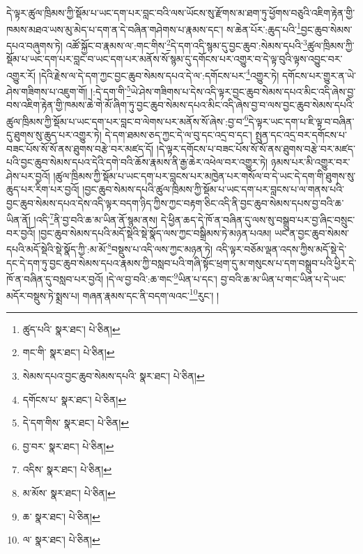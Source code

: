 དེ་ལྟར་ཚུལ་ཁྲིམས་ཀྱི་སྡོམ་པ་ཡང་དག་པར་བླང་བའི་ལས་ཡོངས་སུ་རྫོགས་མ་ཐག་ཏུ་ཕྱོགས་བཅུའི་འཇིག་རྟེན་གྱི་ཁམས་མཐའ་ཡས་མུ་མེད་པ་དག་ན་དེ་བཞིན་གཤེགས་པ་རྣམས་དང་། ས་ཆེན་པོར་:ཆུད་པའི་\footnote{ཚུད་པའི་  སྣར་ཐང་།  པེ་ཅིན། }བྱང་ཆུབ་སེམས་དཔའ་བཞུགས་ཏེ། འཚོ་སྐྱོང་བ་རྣམས་ལ་:གང་གིས་\footnote{གང་གི་  སྣར་ཐང་།  པེ་ཅིན། }དེ་དག་འདི་སྙམ་དུ་བྱང་ཆུབ་:སེམས་དཔའི་\footnote{སེམས་དཔའ་བྱང་ཆུབ་སེམས་དཔའི་  སྣར་ཐང་།  པེ་ཅིན། }ཚུལ་ཁྲིམས་ཀྱི་སྡོམ་པ་ཡང་དག་པར་བླང་བ་ཡང་དག་པར་མནོས་སོ་སྙམ་དུ་དགོངས་པར་འགྱུར་བ་དེ་ལྟ་བུའི་ལྟས་འབྱུང་བར་འགྱུར་རོ། །དེའི་རྗེས་ལ་དེ་དག་ཀྱང་བྱང་ཆུབ་སེམས་དཔའ་དེ་ལ་:དགོངས་པར་\footnote{དགོངས་པ་  སྣར་ཐང་།  པེ་ཅིན། }འགྱུར་ཏེ། དགོངས་པར་གྱུར་ན་ཡེ་ཤེས་གཟིགས་པ་འཇུག་གོ། །:དེ་དག་གི་\footnote{དེ་དག་གིས་  སྣར་ཐང་།  པེ་ཅིན། }ཡེ་ཤེས་གཟིགས་པ་དེས་འདི་ལྟར་བྱང་ཆུབ་སེམས་དཔའ་མིང་འདི་ཞེས་བྱ་བས་འཇིག་རྟེན་གྱི་ཁམས་ཆེ་གེ་མོ་ཞིག་ཏུ་བྱང་ཆུབ་སེམས་དཔའ་མིང་འདི་ཞེས་བྱ་བ་ལས་བྱང་ཆུབ་སེམས་དཔའི་ཚུལ་ཁྲིམས་ཀྱི་སྡོམ་པ་ཡང་དག་པར་བླང་བ་ལེགས་པར་མནོས་སོ་ཞེས་:བྱ་བ་\footnote{བྱ་བར་  སྣར་ཐང་།  པེ་ཅིན། }དེ་ལྟར་ཡང་དག་པ་ཇི་ལྟ་བ་བཞིན་དུ་ཐུགས་སུ་ཆུད་པར་འགྱུར་ཏེ། དེ་དག་ཐམས་ཅད་ཀྱང་དེ་ལ་བུ་དང་འདྲ་བ་དང་། སྤུན་དང་འདྲ་བར་དགོངས་པ་བཟང་པོས་སོ་སོ་ནས་ཐུགས་བརྩེ་བར་མཛད་དོ། །དེ་ལྟར་དགོངས་པ་བཟང་པོས་སོ་སོ་ནས་ཐུགས་བརྩེ་བར་མཛད་པའི་བྱང་ཆུབ་སེམས་དཔའ་དེའི་དགེ་བའི་ཆོས་རྣམས་ནི་རྒྱ་ཆེར་འཕེལ་བར་འགྱུར་ཏེ། ཉམས་པར་མི་འགྱུར་བར་ཤེས་པར་བྱའོ། །ཚུལ་ཁྲིམས་ཀྱི་སྡོམ་པ་ཡང་དག་པར་བླངས་པར་མཁྱེན་པར་གསོལ་བ་དེ་ཡང་དེ་དག་གི་ཐུགས་སུ་ཆུད་པར་རིག་པར་བྱའོ། །བྱང་ཆུབ་སེམས་དཔའི་ཚུལ་ཁྲིམས་ཀྱི་སྡོམ་པ་ཡང་དག་པར་བླངས་པ་ལ་གནས་པའི་བྱང་ཆུབ་སེམས་དཔའ་དེས་འདི་ལྟར་བདག་ཉིད་ཀྱིས་ཀྱང་བརྟག་ཅིང་འདི་ནི་བྱང་ཆུབ་སེམས་དཔས་བྱ་བའི་ཆ་ཡིན་ནོ། །འདི་\footnote{འདིས་  སྣར་ཐང་།  པེ་ཅིན། }ནི་བྱ་བའི་ཆ་མ་ཡིན་ནོ་སྙམ་ནས། དེ་ཕྱིན་ཆད་དེ་ཁོ་ན་བཞིན་དུ་ལས་སུ་བསྒྲུབ་པར་བྱ་ཞིང་བསྲུང་བར་བྱའོ། །བྱང་ཆུབ་སེམས་དཔའི་མདོ་སྡེའི་སྡེ་སྣོད་ལས་ཀྱང་བསྒྲིམས་ཏེ་མཉན་པའམ། ཡང་ན་བྱང་ཆུབ་སེམས་དཔའི་མདོ་སྡེའི་སྡེ་སྣོད་ཀྱི་:མ་མོ་\footnote{མ་མོས་  སྣར་ཐང་།  པེ་ཅིན། }བསྡུས་པ་འདི་ལས་ཀྱང་མཉན་ཏེ། འདི་ལྟར་བཅོམ་ལྡན་འདས་ཀྱིས་མདོ་སྡེ་དེ་དང་དེ་དག་ཏུ་བྱང་ཆུབ་སེམས་དཔའ་རྣམས་ཀྱི་བསླབ་པའི་གཞི་སྟོང་ཕྲག་དུ་མ་གསུངས་པ་དག་བསྒྲུབ་པའི་ཕྱིར་དེ་ཁོ་ན་བཞིན་དུ་བསླབ་པར་བྱའོ། །དེ་ལ་བྱ་བའི་:ཆ་གང་\footnote{ཆ་  སྣར་ཐང་།  པེ་ཅིན། }ཡིན་པ་དང་། བྱ་བའི་ཆ་མ་ཡིན་པ་གང་ཡིན་པ་དེ་ཡང་མདོར་བསྡུས་ཏེ་སྨྲས་པ། གཞན་རྣམས་དང་ནི་བདག་ལའང་\footnote{ལ་  སྣར་ཐང་།  པེ་ཅིན། }རུང་། །
